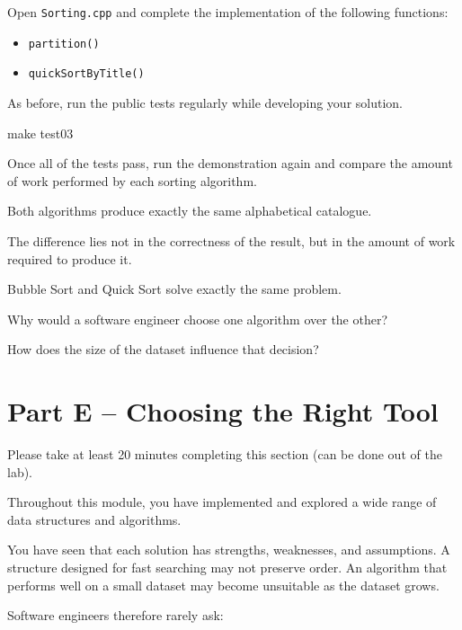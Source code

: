 \documentclass{csc2059practical}
\begin{document}
Open \texttt{Sorting.cpp} and complete the implementation of the following functions:

\begin{itemize}
    \item \texttt{partition()}
    \item \texttt{quickSortByTitle()}
\end{itemize}

As before, run the public tests regularly while developing your solution.

\begin{terminal}
make test03
\end{terminal}

Once all of the tests pass, run the demonstration again and compare the amount of work performed by each sorting algorithm.

\begin{importantnote}
Both algorithms produce exactly the same alphabetical catalogue.

The difference lies not in the correctness of the result, but in the amount of work required to produce it.
\end{importantnote}

\begin{reflectionbox}
Bubble Sort and Quick Sort solve exactly the same problem.

Why would a software engineer choose one algorithm over the other?

How does the size of the dataset influence that decision?
\end{reflectionbox}

\section{Part E -- Choosing the Right Tool}
\begin{infobox}
    Please take at least 20 minutes completing this section (can be done out of the lab).
\end{infobox}

Throughout this module, you have implemented and explored a wide range of data structures and algorithms.

You have seen that each solution has strengths, weaknesses, and assumptions. A structure designed for fast searching may not preserve order. An algorithm that performs well on a small dataset may become unsuitable as the dataset grows.

Software engineers therefore rarely ask:
\end{document}
